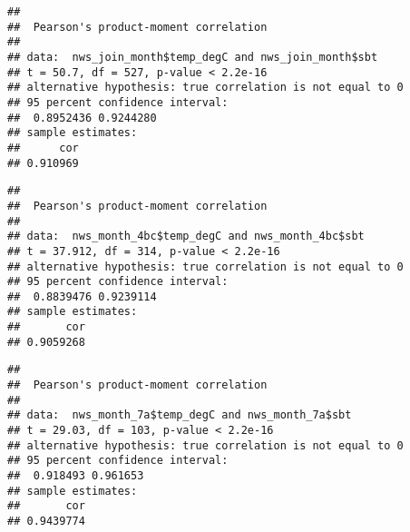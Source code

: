 \documentclass[
]{article}
\newenvironment{Shaded}{\begin{snugshade}}{\end{snugshade}}
\newcommand{\FunctionTok}[1]{\textcolor[rgb]{0.00,0.00,0.00}{#1}}
\newcommand{\NormalTok}[1]{#1}
\newcommand{\OtherTok}[1]{\textcolor[rgb]{0.56,0.35,0.01}{#1}}
\newcommand{\SpecialCharTok}[1]{\textcolor[rgb]{0.00,0.00,0.00}{#1}}
\newcommand{\StringTok}[1]{\textcolor[rgb]{0.31,0.60,0.02}{#1}}
\begin{document}
\begin{verbatim}
## 
##  Pearson's product-moment correlation
## 
## data:  nws_join_month$temp_degC and nws_join_month$sbt
## t = 50.7, df = 527, p-value < 2.2e-16
## alternative hypothesis: true correlation is not equal to 0
## 95 percent confidence interval:
##  0.8952436 0.9244280
## sample estimates:
##      cor 
## 0.910969
\end{verbatim}

\begin{Shaded}
\end{Shaded}

\begin{verbatim}
## 
##  Pearson's product-moment correlation
## 
## data:  nws_month_4bc$temp_degC and nws_month_4bc$sbt
## t = 37.912, df = 314, p-value < 2.2e-16
## alternative hypothesis: true correlation is not equal to 0
## 95 percent confidence interval:
##  0.8839476 0.9239114
## sample estimates:
##       cor 
## 0.9059268
\end{verbatim}

\begin{Shaded}
\end{Shaded}

\begin{verbatim}
## 
##  Pearson's product-moment correlation
## 
## data:  nws_month_7a$temp_degC and nws_month_7a$sbt
## t = 29.03, df = 103, p-value < 2.2e-16
## alternative hypothesis: true correlation is not equal to 0
## 95 percent confidence interval:
##  0.918493 0.961653
## sample estimates:
##       cor 
## 0.9439774
\end{verbatim}
\end{document}
